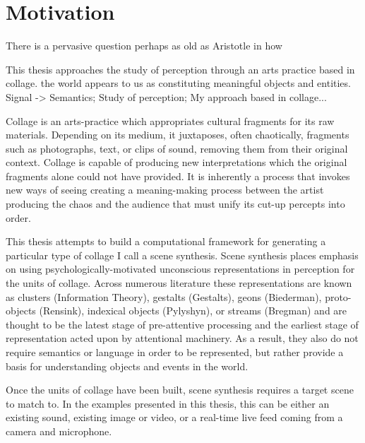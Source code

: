 \documentclass[a4paper,10pt,final]{ThesisStyle}
\begin{document}
\section{Motivation}

There is a pervasive question perhaps as old as Aristotle in how 

This thesis approaches the study of perception through an arts practice based in collage.  the world appears to us as constituting meaningful objects and entities.  Signal -> Semantics; Study of perception; My approach based in collage... 

Collage is an arts-practice which appropriates cultural fragments for its raw materials.  Depending on its medium, it juxtaposes, often chaotically, fragments such as photographs, text, or clips of sound, removing them from their original context.  Collage is capable of producing new interpretations which the original fragments alone could not have provided.  It is inherently a process that invokes new ways of seeing creating a meaning-making process between the artist producing the chaos and the audience that must unify its cut-up percepts into order.  %


This thesis attempts to build a computational framework for generating a particular type of collage I call a scene synthesis.  Scene synthesis places emphasis on using psychologically-motivated unconscious representations in perception for the units of collage.  Across numerous literature these representations are known as clusters (Information Theory), gestalts (Gestalts), geons (Biederman), proto-objects (Rensink), indexical objects (Pylyshyn), or streams (Bregman) and are thought to be the latest stage of pre-attentive processing and the earliest stage of representation acted upon by attentional machinery.  As a result, they also do not require semantics or language in order to be represented, but rather provide a basis for understanding objects and events in the world.  

Once the units of collage have been built, scene synthesis requires a target scene to match to.  In the examples presented in this thesis, this can be either an existing sound, existing image or video, or a real-time live feed coming from a camera and microphone.   
\end{document}
